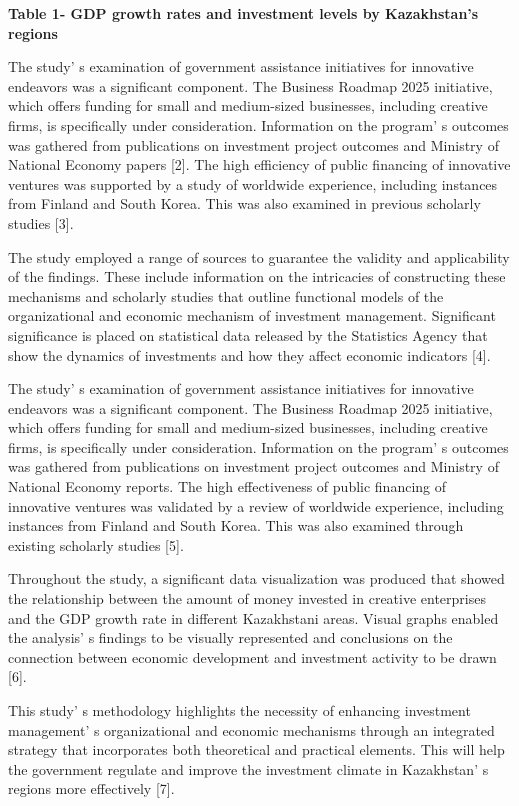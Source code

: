 {\bfseries Table 1- GDP growth rates and investment levels by Kazakhstan's
regions}

The study' s examination of government assistance
initiatives for innovative endeavors was a significant component. The
Business Roadmap 2025 initiative, which offers funding for small and
medium-sized businesses, including creative firms, is specifically under
consideration. Information on the program' s outcomes was
gathered from publications on investment project outcomes and Ministry
of National Economy papers {[}2{]}. The high efficiency of public
financing of innovative ventures was supported by a study of worldwide
experience, including instances from Finland and South Korea. This was
also examined in previous scholarly studies {[}3{]}.

The study employed a range of sources to guarantee the validity and
applicability of the findings. These include information on the
intricacies of constructing these mechanisms and scholarly studies that
outline functional models of the organizational and economic mechanism
of investment management. Significant significance is placed on
statistical data released by the Statistics Agency that show the
dynamics of investments and how they affect economic indicators {[}4{]}.

The study' s examination of government assistance
initiatives for innovative endeavors was a significant component. The
Business Roadmap 2025 initiative, which offers funding for small and
medium-sized businesses, including creative firms, is specifically under
consideration. Information on the program' s outcomes was
gathered from publications on investment project outcomes and Ministry
of National Economy reports. The high effectiveness of public financing
of innovative ventures was validated by a review of worldwide
experience, including instances from Finland and South Korea. This was
also examined through existing scholarly studies {[}5{]}.

Throughout the study, a significant data visualization was produced that
showed the relationship between the amount of money invested in creative
enterprises and the GDP growth rate in different Kazakhstani areas.
Visual graphs enabled the analysis' s findings to be
visually represented and conclusions on the connection between economic
development and investment activity to be drawn {[}6{]}.

This study' s methodology highlights the necessity of
enhancing investment management' s organizational and
economic mechanisms through an integrated strategy that incorporates
both theoretical and practical elements. This will help the government
regulate and improve the investment climate in
Kazakhstan' s regions more effectively {[}7{]}.

